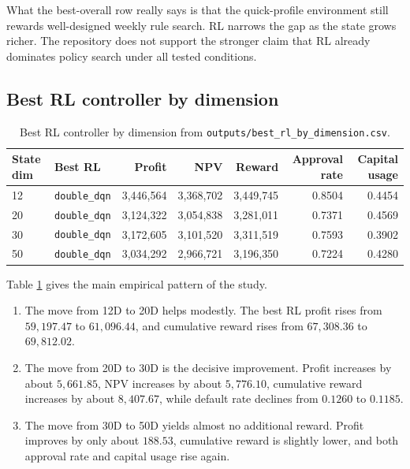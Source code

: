 \documentclass[12pt,a4paper]{article}
\begin{document}
What the best-overall row really says is that the quick-profile environment still rewards well-designed weekly rule search. RL narrows the gap as the state grows richer. The repository does not support the stronger claim that RL already dominates policy search under all tested conditions.

\subsection{Best RL controller by dimension}

\begin{table}[H]
    \centering
    \small
    \begin{tabular}{l l r r r r r}
        \toprule
        State dim & Best RL              & Profit        & NPV           & Reward        & Approval rate & Capital usage \\
        \midrule
        12        & \texttt{double\_dqn} & 3{,}446{,}564 & 3{,}368{,}702 & 3{,}449{,}745 & 0.8504        & 0.4454        \\
        20        & \texttt{double\_dqn} & 3{,}124{,}322 & 3{,}054{,}838 & 3{,}281{,}011 & 0.7371        & 0.4569        \\
        30        & \texttt{double\_dqn} & 3{,}172{,}605 & 3{,}101{,}520 & 3{,}311{,}519 & 0.7593        & 0.3902        \\
        50        & \texttt{double\_dqn} & 3{,}034{,}292 & 2{,}966{,}721 & 3{,}196{,}350 & 0.7224        & 0.4280        \\
        \bottomrule
    \end{tabular}
    \caption{Best RL controller by dimension from \texttt{outputs/best\_rl\_by\_dimension.csv}.}
    \label{tab:en-best-rl}
\end{table}

Table \ref{tab:en-best-rl} gives the main empirical pattern of the study.
\begin{enumerate}[leftmargin=*]
    \item The move from 12D to 20D helps modestly. The best RL profit rises from $59{,}197.47$ to $61{,}096.44$, and cumulative reward rises from $67{,}308.36$ to $69{,}812.02$.
    \item The move from 20D to 30D is the decisive improvement. Profit increases by about $5{,}661.85$, NPV increases by about $5{,}776.10$, cumulative reward increases by about $8{,}407.67$, while default rate declines from $0.1260$ to $0.1185$.
    \item The move from 30D to 50D yields almost no additional reward. Profit improves by only about $188.53$, cumulative reward is slightly lower, and both approval rate and capital usage rise again.
\end{enumerate}
\end{document}
